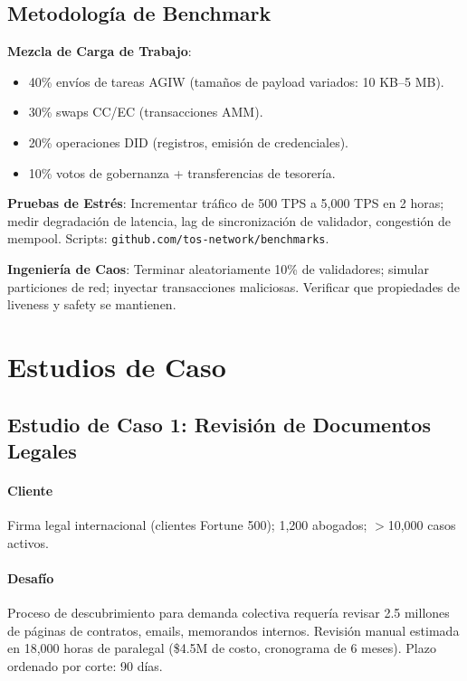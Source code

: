 \documentclass[11pt]{article}
\begin{document}
\subsection{Metodología de Benchmark}

\textbf{Mezcla de Carga de Trabajo}:
\begin{itemize}[noitemsep]
  \item 40\% envíos de tareas AGIW (tamaños de payload variados: 10 KB--5 MB).
  \item 30\% swaps CC/EC (transacciones AMM).
  \item 20\% operaciones DID (registros, emisión de credenciales).
  \item 10\% votos de gobernanza + transferencias de tesorería.
\end{itemize}

\textbf{Pruebas de Estrés}: Incrementar tráfico de 500 TPS a 5,000 TPS en 2 horas; medir degradación de latencia, lag de sincronización de validador, congestión de mempool. Scripts: \texttt{github.com/tos-network/benchmarks}.

\textbf{Ingeniería de Caos}: Terminar aleatoriamente 10\% de validadores; simular particiones de red; inyectar transacciones maliciosas. Verificar que propiedades de liveness y safety se mantienen.

\section{Estudios de Caso}
\label{sec:case-studies}

\subsection{Estudio de Caso 1: Revisión de Documentos Legales}

\paragraph{Cliente} Firma legal internacional (clientes Fortune 500); 1,200 abogados; $>$10,000 casos activos.

\paragraph{Desafío} Proceso de descubrimiento para demanda colectiva requería revisar 2.5 millones de páginas de contratos, emails, memorandos internos. Revisión manual estimada en 18,000 horas de paralegal (\$4.5M de costo, cronograma de 6 meses). Plazo ordenado por corte: 90 días.
\end{document}
